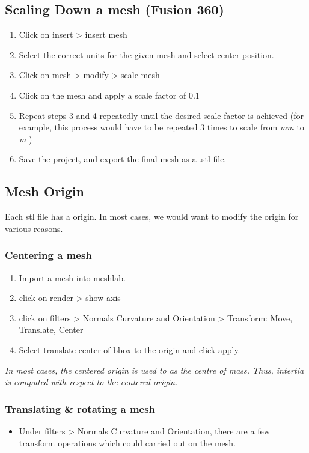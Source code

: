 \documentclass[11pt]{article}
\begin{document}
\subsection{Scaling Down a mesh (Fusion 360) }
\begin{enumerate}
 \item {
       Click on insert > insert mesh
       }
 \item {
       Select the correct units for the given mesh and select center position.
       }
 \item {
       Click on mesh > modify > scale mesh
       }
 \item {
       Click on the mesh and apply a scale factor of 0.1
       }
 \item {
       Repeat steps 3 and 4 repeatedly until the desired scale factor is achieved (for example, this process would have to be repeated 3 times to scale from \emph{mm} to \emph{m} )
       }
 \item{
       Save the project, and export the final mesh as a .stl file.
       }
\end{enumerate}

\subsection{Mesh Origin}
Each stl file has a origin. In most cases, we would want to modify the origin for various reasons.

\subsubsection{Centering a mesh}
\begin{enumerate}
 \item {
       Import a mesh into meshlab.
       }
 \item{
       click on render > show axis
       }
 \item{
       click on filters > Normals Curvature and Orientation > Transform: Move, Translate, Center
       }
 \item{
       Select translate center of bbox to the origin and click apply.

       }

\end{enumerate}
\emph{In most cases, the centered origin is used to as the centre of mass. Thus, intertia is computed with respect to the centered origin.}
\subsubsection{Translating \& rotating a mesh}
\begin{itemize}
 \item {
       Under filters > Normals Curvature and Orientation, there are a few transform operations which could carried out on the mesh.
       }
\end{itemize}
\end{document}
